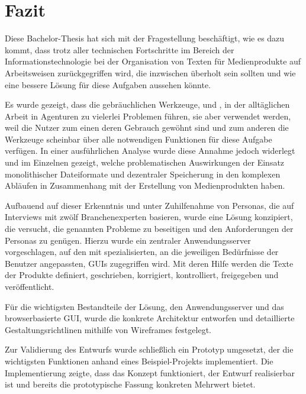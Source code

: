 \section{Fazit}\label{l:fazit}

Diese Bachelor-Thesis hat sich mit der Fragestellung beschäftigt, wie es dazu kommt, dass trotz aller technischen Fortschritte im Bereich der Informationstechnologie bei der Organisation von Texten für Medienprodukte auf Arbeitsweisen zurückgegriffen wird, die inzwischen überholt sein sollten und wie eine bessere Lösung für diese Aufgaben aussehen könnte.

Es wurde gezeigt, dass die gebräuchlichen Werkzeuge,  und , in der alltäglichen Arbeit in Agenturen zu vielerlei Problemen führen, sie aber verwendet werden, weil die Nutzer zum einen deren Gebrauch gewöhnt sind und zum anderen die Werkzeuge scheinbar über alle notwendigen Funktionen für diese Aufgabe verfügen. In einer ausführlichen Analyse wurde diese Annahme jedoch widerlegt und im Einzelnen gezeigt, welche problematischen Auswirkungen der Einsatz monolithischer Dateiformate und dezentraler Speicherung in den komplexen Abläufen in Zusammenhang mit der Erstellung von Medienprodukten haben.

Aufbauend auf dieser Erkenntnis und unter Zuhilfenahme von Personas, die auf Interviews mit zwölf Branchenexperten basieren, wurde eine Lösung konzipiert, die versucht, die genannten Probleme zu beseitigen und den Anforderungen der Personas zu genügen. Hierzu wurde ein zentraler Anwendungsserver vorgeschlagen, auf den mit spezialisierten, an die jeweiligen Bedürfnisse der Benutzer angepassten, GUIs zugegriffen wird. Mit deren Hilfe werden die Texte der Produkte definiert, geschrieben, korrigiert, kontrolliert, freigegeben und veröffentlicht.

Für die wichtigsten Bestandteile der Lösung, den Anwendungsserver und das browserbasierte GUI, wurde die konkrete Architektur entworfen und detaillierte Gestaltungsrichtlinen mithilfe von Wireframes festgelegt.

Zur Validierung des Entwurfs wurde schließlich ein Prototyp umgesetzt, der die wichtigsten Funktionen anhand eines Beispiel-Projekts implementiert. Die Implementierung zeigte, dass das Konzept funktioniert, der Entwurf realisierbar ist und bereits die prototypische Fassung konkreten Mehrwert bietet.

\secbar

\secbar

\pagebreak